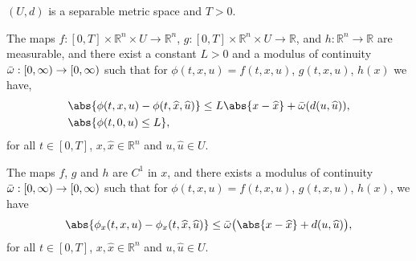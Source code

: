 \begin{asparaenum}[\bf{(}\bf{D}-1\bf{)}]
    \item\label{HipD1}
        $(U,d)$ is a separable metric space and $T>0$.
    \item
        The maps $f:[0,T] \times \mathbb{R}^{n} \times U \to \mathbb{R}^{n}$,
        $g:[0,T] \times \mathbb{R}^{n} \times U \to \mathbb{R}$, and 
        $h:\mathbb{R}^{n} \to \mathbb{R}$ are measurable, and there exist a 
        constant $L>0$ and a modulus of continuity $\Bar{\omega}:[0,\infty) %
        \to [0,\infty)$ such that for $\phi(t,x,u) = f(t,x,u)$, $g(t,x,u)$, $h(x)$
        we have, 
        \begin{equation}\label{HipD2}
            \begin{aligned}
                &\abs{\phi(t,x,u) - \phi(t, \widehat{x}, \widehat{u})} \leq %
                    L\abs{x - \widehat{x}} + \Bar{\omega}(d(u, \widehat{u})),\\
                &\abs{\phi(t,0,u) \leq L},
            \end{aligned}
        \end{equation}
        for all $t \in [0,T]$, $x, \widehat{x} \in \mathbb{R}^{n}$ and
        $u, \widehat{u}\in U$.
    \item
        The maps $f$, $g$ and $h$ are $C^{1}$ in $x$, and there exists a modulus 
        of continuity $\Bar{\omega}: [0,\infty) \to [0,\infty)$ such that for 
        $\phi(t,x,u) = f(t,x,u)$, $g(t,x,u)$, $h(x)$, we have
        \begin{equation}\label{HipD3}
            \abs{\phi_x(t,x,u) - \phi_x(t, \widehat{x}, \widehat{u})} \leq %
            \Bar{\omega}\big(\abs{x - \widehat{x}}  + d(u, \widehat{u})\big),
        \end{equation}
        for all $t \in [0,T]$, $x, \widehat{x} \in \mathbb{R}^{n}$ and
        $u, \widehat{u}\in U$.
\end{asparaenum}
